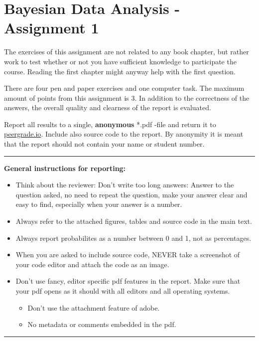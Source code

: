 \documentclass[11pt,a4paper,english]{article}
\newcommand{\HRule}{\rule{\linewidth}{0.5mm}}
\begin{document}
\section*{Bayesian Data Analysis - Assignment 1}


The exercises of this assignment are not related to any book chapter, but rather work to test whether or not you have sufficient knowledge to participate the course. Reading the first chapter might anyway help with the first question.

There are four pen and paper exercises and one computer task. The maximum amount of points from this assignment is 3. In addition to the correctness of the answers, the overall quality and clearness of the report is evaluated.

Report all results to a single, {\bf anonymous} *.pdf -file and return it to \href{peergrade.io}{peergrade.io}. Include also source code to the report. By anonymity it is meant that the report should not contain your name or student number.

\HRule

{\bf General instructions for reporting:}
\begin{itemize}
\setlength{\itemsep}{1pt}
\item Think about the reviewer: Don't write too long answers: Answer to the question asked, no need to repeat the question, make your answer clear and easy to find, especially when your answer is a number.
\item Always refer to the attached figures, tables and source code in the main text.
\item Always report probabilites as a number between 0 and 1, not as percentages.
\item When you are asked to include source code, NEVER take a screenshot of your code editor and attach the code as an image.
\item Don't use fancy, editor specific pdf features in the report. Make sure that your pdf opens as it should with all editors and all operating systems.
\begin{itemize}
\setlength{\itemsep}{1pt}
\item Don't use the attachment feature of adobe.
\item No metadata or comments embedded in the pdf.
\end{itemize}
\end{itemize}
\HRule
\end{document}
